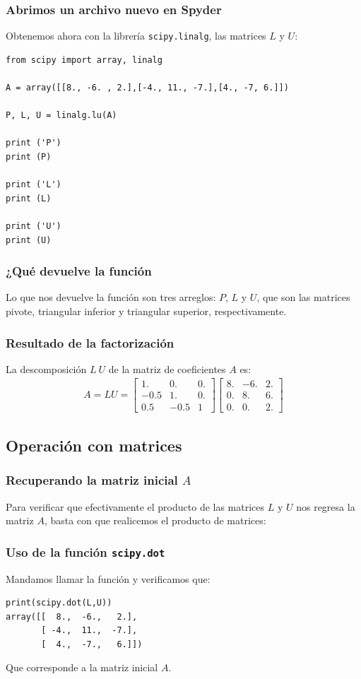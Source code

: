 \begin{frame}
\frametitle{Abrimos un archivo nuevo en Spyder}
Obtenemos ahora con la librería \texttt{scipy.linalg}, las matrices $L$ y $U$:
\begin{lstlisting}[caption=Código para obtener las matrices LU, basicstyle=\linespread{1.1}\ttfamily=\small, columns=fullflexible]
from scipy import array, linalg

A = array([[8., -6. , 2.],[-4., 11., -7.],[4., -7, 6.]])

P, L, U = linalg.lu(A)

print ('P')
print (P)

print ('L')
print (L)

print ('U')
print (U) 	
\end{lstlisting}
\end{frame}
\begin{frame}
\frametitle{¿Qué devuelve la función}
Lo que nos devuelve la función son tres arreglos: $P$, $L$ y $U$, que son las matrices pivote, triangular inferior y triangular superior, respectivamente.
\end{frame}
\begin{frame}
\frametitle{Resultado de la factorización}
La descomposición $L \: U$ de la matriz de coeficientes $A$ es:
\begin{align*}
A = LU = \begin{bmatrix}
 1. &   0. &   0. \\
 -0.5 & 1. &  0. \\
 0.5 & -0.5 &  1
\end{bmatrix}
\begin{bmatrix}
 8. & -6. &  2. \\
  0. &  8. & 6. \\
  0. &  0. &  2.
\end{bmatrix}
\end{align*}
\end{frame}
\subsection{Operación con matrices}
\begin{frame}[fragile]
\frametitle{Recuperando la matriz inicial $A$}
Para verificar que efectivamente el producto de las matrices $L$ y $U$ nos regresa la matriz $A$, basta con que realicemos el producto de matrices:
\end{frame}
\begin{frame}[fragile]
\frametitle{Uso de la función \texttt{scipy.dot}}
Mandamos llamar la función  y verificamos que:
\begin{exampleblock}{}
\begin{verbatim}
print(scipy.dot(L,U))
array([[  8.,  -6.,   2.],
       [ -4.,  11.,  -7.],
       [  4.,  -7.,   6.]])
\end{verbatim}
\end{exampleblock}
Que corresponde a la matriz inicial $A$.
\end{frame}
